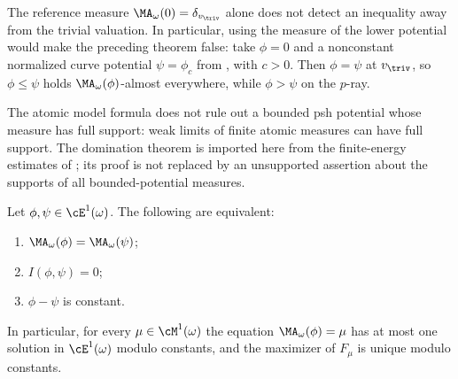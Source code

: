 \begin{remark}
\label{rem:ch47-no-nondegenerate-measure}

The reference measure $\MA_\omega(0)=\delta_{v_{\triv}}$ alone does
not detect an inequality away from the trivial valuation. In particular,
using the measure of the lower potential would make the preceding theorem
false: take $\phi=0$ and a nonconstant normalized curve potential
$\psi=\phi_c$ from , with $c>0$.
Then $\phi=\psi$ at $v_{\triv}$, so $\phi\le\psi$ holds
$\MA_\omega(\phi)$-almost everywhere, while $\phi>\psi$ on the
$p$-ray.

The atomic model formula does not rule out a bounded psh potential whose
measure has full support: weak limits of finite atomic measures can have
full support. The domination theorem is imported here from the
finite-energy estimates of \cite[\S10]{BJ22}; its proof is not replaced by
an unsupported assertion about the supports of all bounded-potential
measures.
\end{remark}

\begin{theorem}
\label{thm:ch47-uniqueness}
Let $\phi,\psi\in\cE^1(\omega)$.  The following are equivalent:
\begin{enumerate}
\item\label{itm:ch47-uniq:ma}
      $\MA_\omega(\phi)=\MA_\omega(\psi)$;
\item\label{itm:ch47-uniq:I}
      $I(\phi,\psi)=0$;
\item\label{itm:ch47-uniq:const}
      $\phi-\psi$ is constant.
\end{enumerate}
In particular, for every $\mu\in\cM^1(\omega)$ the equation
$\MA_\omega(\phi)=\mu$ has at most one solution in $\cE^1(\omega)$
modulo constants, and the maximizer of $F_\mu$ is unique modulo
constants.
\end{theorem}

